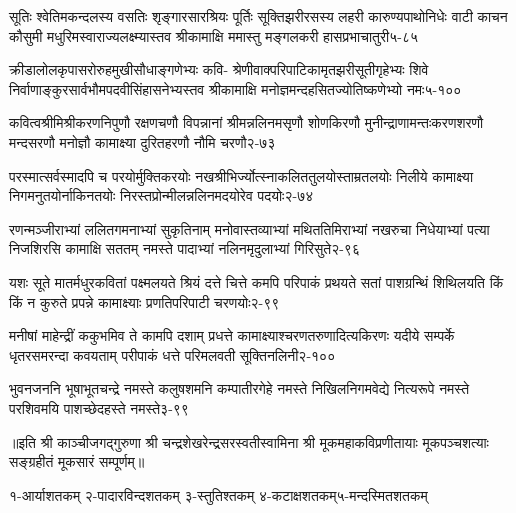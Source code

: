 \annofourlineindentedshloka
{सूतिः श्वेतिमकन्दलस्य वसतिः शृङ्गारसारश्रियः}
{पूर्तिः सूक्तिझरीरसस्य लहरी कारुण्यपाथोनिधेः}
{वाटी काचन कौसुमी मधुरिमस्वाराज्यलक्ष्म्यास्तव}
{श्रीकामाक्षि ममास्तु मङ्गलकरी हासप्रभाचातुरी}{५-८५}

\annofourlineindentedshloka
{क्रीडालोलकृपासरोरुहमुखीसौधाङ्गणेभ्यः कवि-}
{श्रेणीवाक्परिपाटिकामृतझरीसूतीगृहेभ्यः शिवे}
{निर्वाणाङ्कुरसार्वभौमपदवीसिंहासनेभ्यस्तव}
{श्रीकामाक्षि मनोज्ञमन्दहसितज्योतिष्कणेभ्यो नमः}{५-१००}

\annofourlineindentedshloka
{कवित्वश्रीमिश्रीकरणनिपुणौ रक्षणचणौ}
{विपन्नानां श्रीमन्नलिनमसृणौ शोणकिरणौ}
{मुनीन्द्राणामन्तःकरणशरणौ मन्दसरणौ}
{मनोज्ञौ कामाक्ष्या दुरितहरणौ नौमि चरणौ}{२-७३}

\annofourlineindentedshloka
{परस्मात्सर्वस्मादपि च परयोर्मुक्तिकरयोः}
{नखश्रीभिर्ज्योत्स्नाकलिततुलयोस्ताम्रतलयोः}
{निलीये कामाक्ष्या निगमनुतयोर्नाकिनतयोः}
{निरस्तप्रोन्मीलन्नलिनमदयोरेव पदयोः}{२-७४}

\annofourlineindentedshloka
{रणन्मञ्जीराभ्यां ललितगमनाभ्यां सुकृतिनाम्}
{मनोवास्तव्याभ्यां मथिततिमिराभ्यां नखरुचा}
{निधेयाभ्यां पत्या निजशिरसि कामाक्षि सततम्}
{नमस्ते पादाभ्यां नलिनमृदुलाभ्यां गिरिसुते}{२-९६}

\annofourlineindentedshloka
{यशः सूते मातर्मधुरकवितां पक्ष्मलयते}
{श्रियं दत्ते चित्ते कमपि परिपाकं प्रथयते}
{सतां पाशग्रन्थिं शिथिलयति किं किं न कुरुते}
{प्रपन्ने कामाक्ष्याः प्रणतिपरिपाटी चरणयोः}{२-९९}

\annofourlineindentedshloka
{मनीषां माहेन्द्रीं ककुभमिव ते कामपि दशाम्}
{प्रधत्ते कामाक्ष्याश्चरणतरुणादित्यकिरणः}
{यदीये सम्पर्के धृतरसमरन्दा कवयताम्}
{परीपाकं धत्ते परिमलवती सूक्तिनलिनी}{२-१००}

\annofourlineindentedshloka
{भुवनजननि भूषाभूतचन्द्रे नमस्ते}
{कलुषशमनि कम्पातीरगेहे नमस्ते}
{निखिलनिगमवेद्ये नित्यरूपे नमस्ते}
{परशिवमयि पाशच्छेदहस्ते नमस्ते}{३-९९}

॥इति श्री काञ्चीजगद्गुरुणा श्री चन्द्रशेखरेन्द्रसरस्वतीस्वामिना श्री मूकमहाकविप्रणीतायाः मूकपञ्चशत्याः सङ्ग्रहीतं मूकसारं सम्पूर्णम्॥

\footnotesize{१-आर्याशतकम् \quad २-पादारविन्दशतकम् \quad ३-स्तुतिश्तकम् \quad ४-कटाक्षशतकम्\quad ५-मन्दस्मितशतकम्}